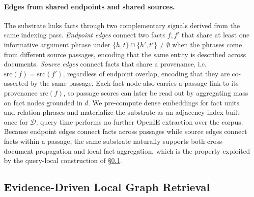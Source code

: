 \paragraph{Edges from shared endpoints and shared sources.}
The substrate links facts through two complementary signals derived
from the same indexing pass. \emph{Endpoint edges} connect two facts
$f, f'$ that share at least one informative argument phrase under
$\{h,t\}\cap\{h',t'\}\neq\emptyset$ when the phrases come from
different source passages, encoding that the same entity is described
across documents. \emph{Source edges} connect facts that share a
provenance, i.e.\ $\mathrm{src}(f)=\mathrm{src}(f')$, regardless of
endpoint overlap, encoding that they are co-asserted by the same
passage. Each fact node also carries a passage link to its provenance
$\mathrm{src}(f)$, so passage scores can later be read out by
aggregating mass on fact nodes grounded in $d$. We pre-compute dense
embeddings for fact units and relation phrases and materialize the
substrate as an adjacency index built once for $\mathcal{D}$; query
time performs no further OpenIE extraction over the corpus. Because
endpoint edges connect facts across passages while source edges
connect facts within a passage, the same substrate naturally supports
both cross-document propagation and local fact aggregation, which is
the property exploited by the query-local construction of
\S\ref{sec:method:retrieval}.

\subsection{Evidence-Driven Local Graph Retrieval}
\label{sec:method:retrieval}

